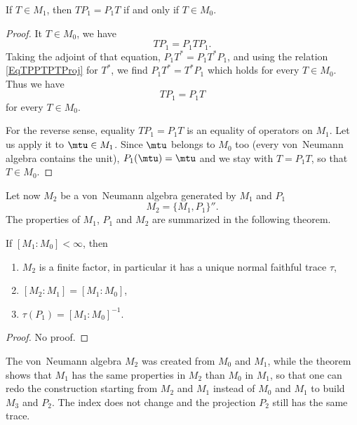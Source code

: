 \begin{lemma}		\label{LemTMunPTTPiffTMzero}
If $T\in M_1$, then $TP_1=P_1T$ if and only if $T\in M_0$.
\end{lemma}

\begin{proof}
It $T\in M_0$, we have
\begin{equation}		\label{EqTPPTPTProj}
	TP_1=P_1TP_1.
\end{equation}
Taking the adjoint of that equation, $P_1T^*=P_1T^*P_1$, and using the relation \eqref{EqTPPTPTProj} for $T^*$, we find $P_1T^*=T^*P_1$ which holds for every $T\in M_0$. Thus we have
\begin{equation}
	TP_1=P_1T
\end{equation}
for every $T\in M_0$.

For the reverse sense, equality $TP_1=P_1T$ is an equality of operators on $M_1$. Let us apply it to $\mtu\in M_1$. Since $\mtu$ belongs to $M_0$ too (every von~Neumann algebra contains the unit), $P_1(\mtu)=\mtu$ and we stay with $T=P_1T$, so that $T\in M_0$.
\end{proof}

Let now $M_2$ be a von~Neumann algebra generated by $M_1$ and $P_1$
\begin{equation}
	M_2=\{ M_1,P_1 \}''.
\end{equation}
The properties of $M_1$, $P_1$ and $M_2$ are summarized in the following theorem.
\begin{theorem}
	If $[M_1:M_0]<\infty$, then
\begin{enumerate}
\item $M_2$ is a finite factor, in particular it has a unique normal faithful trace $\tau$,
\item $[M_2:M_1]=[M_1:M_0]$,
\item $\tau(P_1)=[M_1:M_0]^{-1}$.
\end{enumerate}
\end{theorem}
\begin{proof}
No proof.
\end{proof}

The von~Neumann algebra $M_2$ was created from $M_0$ and $M_1$, while the theorem shows that $M_1$ has the same properties in $M_2$ than $M_0$ in $M_1$, so that one can redo the construction starting from $M_2$ and $M_1$ instead of $M_0$ and $M_1$ to build $M_3$ and $P_2$. The index does not change and the projection $P_2$ still has the same trace.

